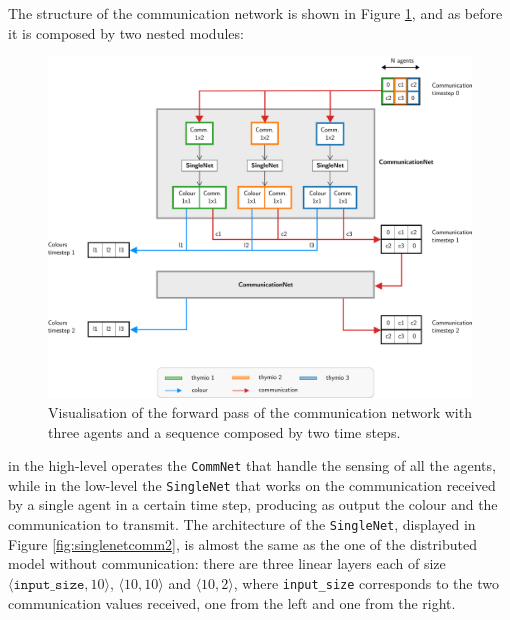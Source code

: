 The structure of the communication network is shown in Figure 
\ref{fig:commnet2}, and as before it is composed by two nested 
modules: 
\begin{figure}[!htb]
	\centering
	\includegraphics[width=\textwidth]{contents/images/commnettask2}
	\caption[Communication network of the second task.]{Visualisation of the 
		forward pass of the communication network with three agents and a 
		sequence 
		composed by two time steps.}
	\label{fig:commnet2}
\end{figure}
in the high-level operates the \texttt{CommNet} that handle the 
sensing of all the agents, while in the low-level the \texttt{SingleNet} that 
works on the communication received by a single agent in a certain time 
step, producing as output the colour and the communication to transmit. 
The architecture of the \texttt{SingleNet}, displayed in Figure 
\ref{fig:singlenetcomm2}, is almost the same as the one of the distributed 
model without communication: there are three linear layers each of size 
$\langle \mathtt{input\_size}, 10\rangle$,  $\langle 10, 10\rangle$ and 
$\langle 10, 2\rangle$, where \texttt{input\_size} corresponds to the two 
communication values received, one from the left and one from the right.
